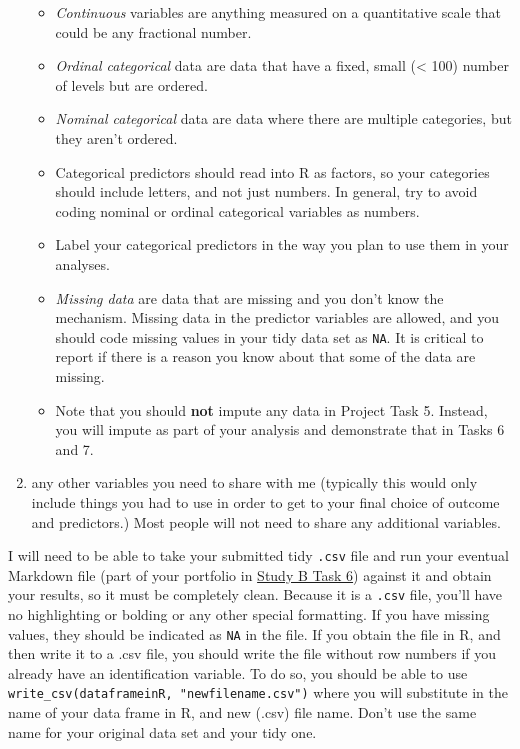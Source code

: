 \documentclass[]{book}
\providecommand{\tightlist}{%
  \setlength{\itemsep}{0pt}\setlength{\parskip}{0pt}}
\begin{document}
\begin{enumerate}
  \begin{itemize}
  \tightlist
  \item
    \emph{Continuous} variables are anything measured on a quantitative scale that could be any fractional number.
  \item
    \emph{Ordinal categorical} data are data that have a fixed, small (\textless{} 100) number of levels but are ordered.
  \item
    \emph{Nominal categorical} data are data where there are multiple categories, but they aren't ordered.
  \item
    Categorical predictors should read into R as factors, so your categories should include letters, and not just numbers. In general, try to avoid coding nominal or ordinal categorical variables as numbers.
  \item
    Label your categorical predictors in the way you plan to use them in your analyses.
  \item
    \emph{Missing data} are data that are missing and you don't know the mechanism. Missing data in the predictor variables are allowed, and you should code missing values in your tidy data set as \texttt{NA}. It is critical to report if there is a reason you know about that some of the data are missing.
  \item
    Note that you should \textbf{not} impute any data in Project Task 5. Instead, you will impute as part of your analysis and demonstrate that in Tasks 6 and 7.
  \end{itemize}
\item
  any other variables you need to share with me (typically this would only include things you had to use in order to get to your final choice of outcome and predictors.) Most people will not need to share any additional variables.
\end{enumerate}

I will need to be able to take your submitted tidy \texttt{.csv} file and run your eventual Markdown file (part of your portfolio in \protect\hyperlink{task6b}{Study B Task 6}) against it and obtain your results, so it must be completely clean. Because it is a \texttt{.csv} file, you'll have no highlighting or bolding or any other special formatting. If you have missing values, they should be indicated as \texttt{NA} in the file. If you obtain the file in R, and then write it to a .csv file, you should write the file without row numbers if you already have an identification variable. To do so, you should be able to use \texttt{write\_csv(dataframeinR,\ "newfilename.csv")} where you will substitute in the name of your data frame in R, and new (.csv) file name. Don't use the same name for your original data set and your tidy one.
\end{document}
